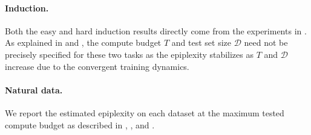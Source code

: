 \documentclass[twoside]{article}
\newcommand{\D}{\mathcal{D}}
\begin{document}
\paragraph{Induction.} Both the easy and hard induction results directly come from the experiments in . As explained in  and , the compute budget $T$ and test set size $\D$ need not be precisely specified for these two tasks as the epiplexity stabilizes as $T$ and $\D$ increase due to the convergent training dynamics.

\paragraph{Natural data.} We report the estimated epiplexity on each dataset at the maximum tested compute budget as described in , , and .
\end{document}
